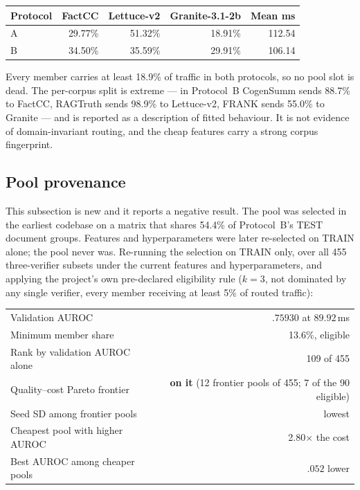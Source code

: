 \documentclass[10pt,a4paper]{article}
\newcommand{\fix}[1]{\textcolor{red!65!black}{#1}}
\begin{document}
\begin{center}\small
\begin{tabular}{lrrrr}
\toprule
Protocol & FactCC & Lettuce-v2 & Granite-3.1-2b & Mean ms \\
\midrule
A & 29.77\% & 51.32\% & 18.91\% & 112.54 \\
B & 34.50\% & 35.59\% & 29.91\% & 106.14 \\
\bottomrule
\end{tabular}
\end{center}

Every member carries at least 18.9\% of traffic in both protocols, so no pool slot is dead. The
per-corpus split is extreme --- in Protocol~B CogenSumm sends 88.7\% to FactCC, RAGTruth sends
98.9\% to Lettuce-v2, FRANK sends 55.0\% to Granite --- and is reported as a description of
fitted behaviour. It is not evidence of domain-invariant routing, and the cheap features carry a
strong corpus fingerprint.

\subsection{Pool provenance}
\label{sec:pool}

\fix{This subsection is new and it reports a negative result.} The pool was selected in the
earliest codebase on a matrix that shares 54.4\% of Protocol~B's TEST document groups. Features
and hyperparameters were later re-selected on TRAIN alone; the pool never was. Re-running the
selection on TRAIN only, over all 455 three-verifier subsets under the current features and
hyperparameters, and applying the project's own pre-declared eligibility rule ($k=3$, not
dominated by any single verifier, every member receiving at least 5\% of routed traffic):

\begin{center}\small
\begin{tabular}{lr}
\toprule
Validation AUROC & $.75930$ at $89.92$\,ms \\
Minimum member share & 13.6\%, eligible \\
Rank by validation AUROC alone & \fix{109 of 455} \\
Quality--cost Pareto frontier & \textbf{on it} (12 frontier pools of 455; 7 of the 90 eligible) \\
Seed SD among frontier pools & lowest \\
Cheapest pool with higher AUROC & 2.80$\times$ the cost \\
Best AUROC among cheaper pools & $.052$ lower \\
\bottomrule
\end{tabular}
\end{center}
\end{document}
